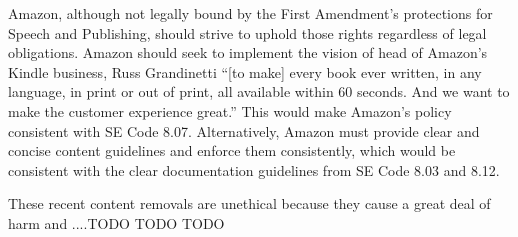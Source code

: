\documentclass[12pt]{article}
\begin{document}
Amazon, although not legally bound by the First Amendment's protections for Speech and Publishing, should strive to uphold those rights regardless of legal obligations.  Amazon should seek to implement the vision of head of Amazon's Kindle business, Russ Grandinetti ``[to make] every book ever written, in any language, in print or out of print, all available within 60 seconds. And we want to make the customer experience great.'' This would make Amazon's policy consistent with SE Code 8.07.  Alternatively, Amazon must provide clear and concise content guidelines and enforce them consistently, which would be consistent with the clear documentation guidelines from SE Code 8.03 and 8.12.

These recent content removals are unethical because they cause a great deal of harm and ....TODO TODO TODO

\nocite{*}




\end{document}
